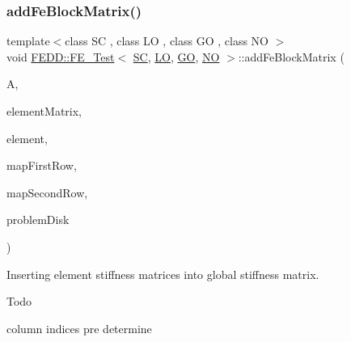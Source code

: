 \subsubsection{\texorpdfstring{add\+Fe\+Block\+Matrix()}{addFeBlockMatrix()}}
{\footnotesize\ttfamily template$<$class SC , class LO , class GO , class NO $>$ \\
void \hyperlink{classFEDD_1_1FE__Test}{F\+E\+D\+D\+::\+F\+E\+\_\+\+Test}$<$ \hyperlink{fe__test__laplace_8cpp_a79c7e86a57edbb2a5a53242bcd04e41e}{SC}, \hyperlink{fe__test__laplace_8cpp_ad6a38c9f07d3fd633eefca5bccad8410}{LO}, \hyperlink{fe__test__laplace_8cpp_afa2946b509009b4f45eb04bd8c5b27d9}{GO}, \hyperlink{fe__test__laplace_8cpp_a5e24f37b28787429872b6ecb1d0417ce}{NO} $>$\+::add\+Fe\+Block\+Matrix (\begin{DoxyParamCaption}\item[{\hyperlink{classFEDD_1_1FE__Test_a2b1edc85a8fab435be53fb22b843af9d}{Block\+Matrix\+Ptr\+\_\+\+Type} \&}]{A,  }\item[{\hyperlink{classFEDD_1_1FE__Test_a675b52d9e58407c6baadb403394be92b}{Small\+Matrix\+Ptr\+\_\+\+Type}}]{element\+Matrix,  }\item[{Finite\+Element}]{element,  }\item[{\hyperlink{classFEDD_1_1FE__Test_ad09d94cdf8e7574fc9b6d1648fa18826}{Map\+Const\+Ptr\+\_\+\+Type}}]{map\+First\+Row,  }\item[{\hyperlink{classFEDD_1_1FE__Test_ad09d94cdf8e7574fc9b6d1648fa18826}{Map\+Const\+Ptr\+\_\+\+Type}}]{map\+Second\+Row,  }\item[{tuple\+\_\+disk\+\_\+vec\+\_\+ptr\+\_\+\+Type}]{problem\+Disk }\end{DoxyParamCaption})\hspace{0.3cm}{\ttfamily [private]}}



Inserting element stiffness matrices into global stiffness matrix. 

\begin{DoxyRefDesc}{Todo}
\item[\hyperlink{todo__todo000010}{Todo}]column indices pre determine\end{DoxyRefDesc}



